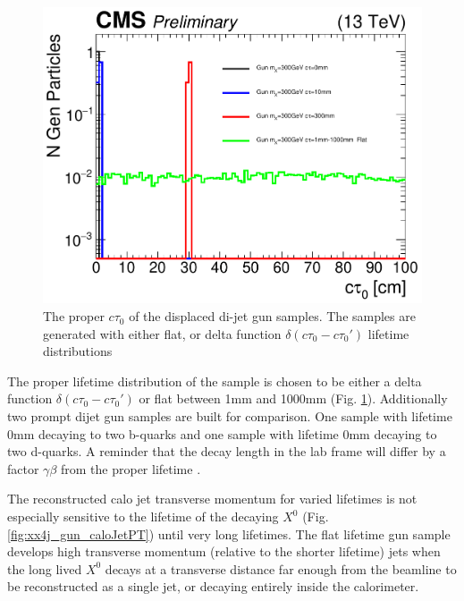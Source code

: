 \begin{figure}
\begin{center}
\includegraphics[width=.45 \textwidth]{figures/an_jetid/VTX_MATCH_IP/GUN_ctau0}
\end{center}
\caption{The proper $c\tau_0$ of the displaced di-jet gun samples. The samples are generated with either flat, or delta function
$\delta(c\tau_0 - c\tau_0')$ lifetime distributions}
\label{fig:gun_ctau0}
\end{figure}

The proper lifetime distribution of the sample is chosen to be either a delta function $\delta(c\tau_0 - c\tau_0')$ or 
flat between 1mm and 1000mm (Fig. \ref{fig:gun_ctau0}). Additionally two prompt dijet gun samples are built for comparison.
One sample with lifetime 0mm decaying to two b-quarks and one sample with lifetime 0mm decaying to two d-quarks. A reminder
that the decay length in the lab frame will differ by a factor $\gamma\beta$ from the proper lifetime . 


The reconstructed calo jet transverse momentum for varied lifetimes is not especially sensitive to the lifetime of the decaying $X^0$ (Fig. \ref{fig:xx4j_gun_caloJetPT})
until very long lifetimes. The flat lifetime gun sample develops high transverse momentum (relative to the shorter lifetime) jets when the long lived $X^0$ decays at 
a transverse distance far enough from the beamline to be reconstructed as a single jet, or
decaying entirely inside the calorimeter. 


